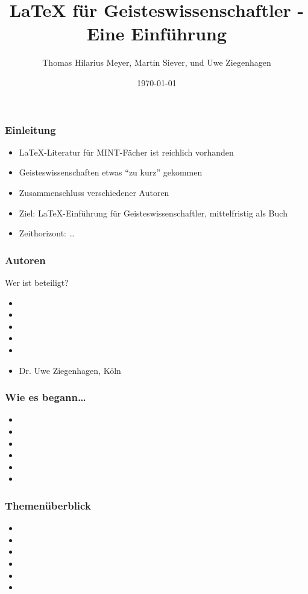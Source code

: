 \documentclass[12pt,ngerman]{beamer}
\title{LaTeX für Geisteswissenschaftler - Eine Einführung}
\date{\today}
\author{Thomas Hilarius Meyer, Martin Siever, und Uwe Ziegenhagen}
\begin{document}
 
\begin{frame}
	 \maketitle
\end{frame}
 
\begin{frame}
\frametitle{Einleitung}

\begin{itemize}
\item \LaTeX-Literatur für MINT-Fächer ist reichlich vorhanden
\item Geisteswissenschaften etwas \enquote{zu kurz} gekommen
\item Zusammenschluss verschiedener Autoren
\item Ziel: \LaTeX-Einführung für Geisteswissenschaftler, mittelfristig als Buch
\item Zeithorizont: \ldots
\end{itemize}

\end{frame}
 
\begin{frame}
\frametitle{Autoren}

Wer ist beteiligt?

\begin{itemize}
\item 
\item 
\item 
\item 
\item 
\item Dr. Uwe Ziegenhagen, Köln
\end{itemize}

\end{frame}

\begin{frame}
\frametitle{Wie es begann\ldots}


\begin{itemize}
\item 
\item 
\item 
\item 
\item 
\item 
\end{itemize}
\end{frame}

 
\begin{frame}
\frametitle{Themenüberblick}


\begin{itemize}
\item 
\item 
\item 
\item 
\item 
\item 
\end{itemize}
\end{frame}
 
\end{document}
